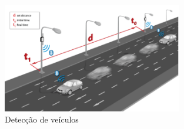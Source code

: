 \begin{figure}[htb]
	\caption{\label{meshlium-carros}Detecção de veículos}
	\begin{center}
		\includegraphics[width=0.70\textwidth]{img/meshlium-carros.png}
	\end{center}
\end{figure}

